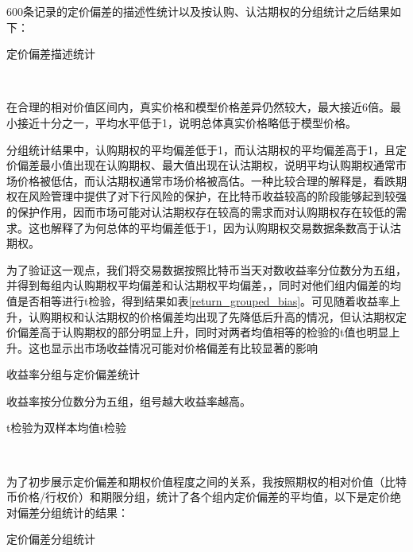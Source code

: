 600条记录的定价偏差的描述性统计以及按认购、认沽期权的分组统计之后结果如下：
~\\
\begin{center}
\begin{threeparttable}[H]
\begin{small}
\caption{定价偏差描述统计}
\label{tab:option_bias_group}
    
    
\end{small} 
\end{threeparttable}
\end{center}
~\\
\par{在合理的相对价值区间内，真实价格和模型价格差异仍然较大，最大接近6倍。最小接近十分之一，平均水平低于1，说明总体真实价格略低于模型价格。}
\par{分组统计结果中，认购期权的平均偏差低于1，而认沽期权的平均偏差高于1，且定价偏差最小值出现在认购期权、最大值出现在认沽期权，说明平均认购期权通常市场价格被低估，而认沽期权通常市场价格被高估。一种比较合理的解释是，看跌期权在风险管理中提供了对下行风险的保护，在比特币收益较高的阶段能够起到较强的保护作用，因而市场可能对认沽期权存在较高的需求而对认购期权存在较低的需求。这也解释了为何总体的平均偏差低于1，因为认购期权交易数据条数高于认沽期权。
\par{为了验证这一观点，我们将交易数据按照比特币当天对数收益率分位数分为五组，并得到每组内认购期权平均偏差和认沽期权平均偏差，，同时对他们组内偏差的均值是否相等进行t检验，得到结果如表\ref{return_grouped_bias}。可见随着收益率上升，认购期权和认沽期权的价格偏差均出现了先降低后升高的情况，但认沽期权定价偏差高于认购期权的部分明显上升，同时对两者均值相等的检验的t值也明显上升。这也显示出市场收益情况可能对价格偏差有比较显著的影响}
\begin{center}
    \begin{threeparttable}[H]
        \caption{收益率分组与定价偏差统计}
        \label{return_grouped_bias}
        
        \begin{tablenotes}
            \footnotesize
            \item 收益率按分位数分为五组，组号越大收益率越高。
            \item t检验为双样本均值t检验
        \end{tablenotes}
    \end{threeparttable}
    
\end{center}
~\\
\par{为了初步展示定价偏差和期权价值程度之间的关系，我按照期权的相对价值（比特币价格/行权价）和期限分组，统计了各个组内定价偏差的平均值，以下是定价绝对偏差分组统计的结果：}
~\\
\begin{center}
\begin{threeparttable}[HT]
\centering
\caption{定价偏差分组统计}
\label{grouped}
\label{tab:option_bias_group}
\begin{small}


\end{small}
\end{threeparttable}
\end{center}}
